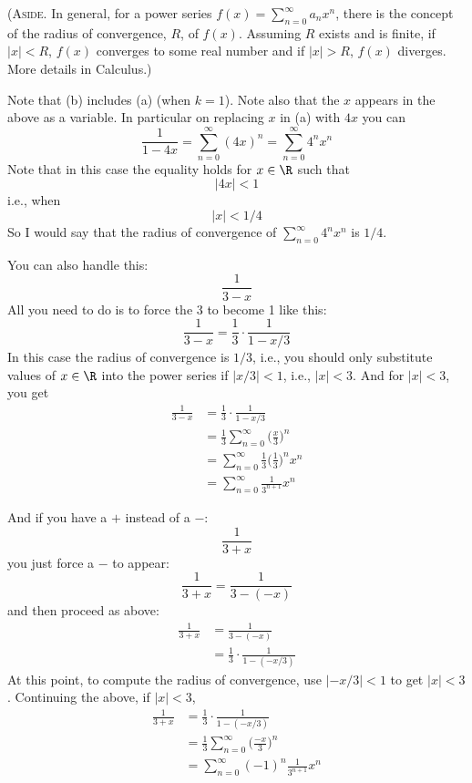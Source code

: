 (\textsc{Aside.}
In general, for a power series $f(x) =\sum_{n=0}^\infty a_nx^n$,
there is the concept of the radius of convergence, $R$, of $f(x)$.
Assuming $R$ exists and is finite,
if $|x| < R$, $f(x)$ converges to some
real number and if $|x| > R$, $f(x)$ diverges.
More details in Calculus.)

Note that (b) includes (a) (when $k=1$).
Note also that the $x$ appears in the above as a variable.
In particular on replacing $x$ in (a) with $4x$ you can
\[
\frac{1}{1-4x} = \sum_{n=0}^\infty (4x)^n = \sum_{n=0}^\infty 4^n x^n 
\]
Note that in this case the equality holds for $x \in \R$ such that
\[
|4x| < 1
\]
i.e., when
\[
|x| < 1/4
\]
So I would say that the radius of convergence of $\sum_{n=0}^\infty 4^n x^n$ is $1/4$.

You can also handle this:
\[
\frac{1}{3-x}
\]
All you need to do is to force the 3 to become 1 like this:
\[
\frac{1}{3-x} 
= \frac{1}{3} \cdot \frac{1}{1 - x/3}
\]
In this case the radius of convergence is $1/3$, i.e., you should only
substitute values of $x \in \R$ into the power series if $|x/3| < 1$,
i.e., $|x| < 3$.
And for $|x| < 3$, you get
\begin{align*}
\frac{1}{3-x} 
&= \frac{1}{3} \cdot \frac{1}{1 - x/3} \\
&= \frac{1}{3} \sum_{n=0}^\infty \biggl( \frac{x}{3} \biggr)^n \\
&= \sum_{n=0}^\infty \frac{1}{3} \biggl( \frac{1}{3} \biggr)^n x^n \\
&= \sum_{n=0}^\infty \frac{1}{3^{n+1}} x^n
\end{align*}

And if you have a $+$ instead of a $-$:
\[
\frac{1}{3+x} 
\]
you just force a $-$ to appear:
\[
\frac{1}{3+x} 
= \frac{1}{3 - (-x)}
\]
and then proceed as above:
\begin{align*}
\frac{1}{3+x} 
&= \frac{1}{3 - (-x)} \\
&= \frac{1}{3} \cdot \frac{1}{1 - (-x/3)}
\end{align*}
At this point, to compute the radius of convergence, use $|-x/3| < 1$ to get
$|x| < 3$.
Continuing the above, if $|x| < 3$,
\begin{align*}
\frac{1}{3+x} 
&= \frac{1}{3} \cdot \frac{1}{1 - (-x/3)} \\
&= \frac{1}{3} \sum_{n=0}^\infty \biggl( \frac{-x}{3} \biggr)^n \\
&= \sum_{n=0}^\infty (-1)^n \frac{1}{3^{n+1}} x^n
\end{align*}


